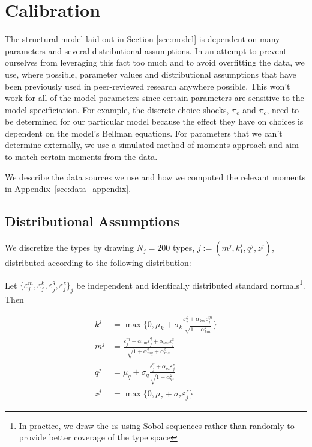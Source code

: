 
\section{Calibration} \label{sec:calibration}

The structural model laid out in Section \ref{sec:model} is dependent on many parameters and several
distributional assumptions. In an attempt to prevent ourselves from leveraging this fact too much
and to avoid overfitting the data, we use, where possible, parameter values and distributional
assumptions that have been previously used in peer-reviewed research anywhere possible. This won't
work for all of the model parameters since certain parameters are sensitive to the model
specificiation. For example, the discrete choice shocks, $\pi_e$ and $\pi_c$, need to be determined
for our particular model because the effect they have on choices is dependent on the model's Bellman
equations. For parameters that we can't determine externally, we use a simulated method of moments
approach and aim to match certain moments from the data.

We describe the data sources we use and how we computed the relevant moments in
Appendix~\ref{sec:data_appendix}.


\subsection{Distributional Assumptions}

  We discretize the types by drawing $N_j=200$ types, $j := (m^j, k_1^j, q^j, z^j)$, distributed
  according to the following distribution:

  Let $\{ \varepsilon_j^m, \varepsilon_j^k, \varepsilon_j^q, \varepsilon_j^z \}_j$ be independent
  and identically distributed standard normals\footnote{In practice, we draw the $\varepsilon$s
  using Sobol sequences rather than randomly to provide better coverage of the type space}. Then

  \begin{align*}
    k^j &= \max \{0, \mu_k + \sigma_k \frac{\varepsilon_j^k + \alpha_{km} \varepsilon_j^m}{\sqrt{1 + \alpha_{km}^2}} \} \\
    m^j &= \frac{\varepsilon_j^m + \alpha_{mq} \varepsilon_j^q + \alpha_{mz} \varepsilon_j^z}{\sqrt{1 + \alpha_{mq}^2 + \alpha_{mz}^2}} \\
    q^j &= \mu_q + \sigma_q \frac{\varepsilon_j^q + \alpha_{qz} \varepsilon_j^z}{\sqrt{1 + \alpha_{qz}^2}} \\
    z^j &= \max \{0, \mu_z + \sigma_z \varepsilon_j^z \}
  \end{align*}

